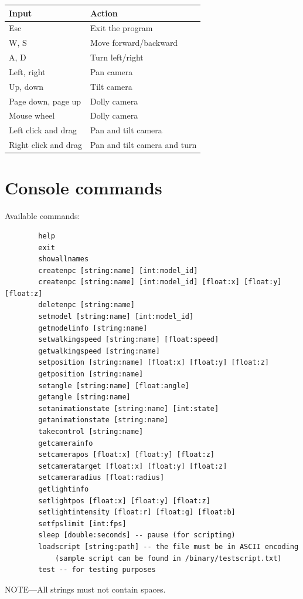 \documentclass[12pt,letterpaper]{article}
\begin{document}
	\begin{tabular}{| l | l |} \hline
	\textbf{Input} & \textbf{Action} \\\hline
	Esc & Exit the program \\\hline
	W, S & Move forward/backward \\\hline
	A, D & Turn left/right\\\hline
	Left, right & Pan camera\\\hline
	Up, down & Tilt camera\\\hline
	Page down, page up & Dolly camera\\\hline
	Mouse wheel & Dolly camera\\\hline
	Left click and drag & Pan and tilt camera\\\hline
	Right click and drag & Pan and tilt camera and turn\\\hline
	\end{tabular}
	
	\section{Console commands}
	
	Available commands:
	
	\begin{framed}
		\footnotesize
		\begin{verbatim}
		help
		exit
		showallnames
		createnpc [string:name] [int:model_id]
		createnpc [string:name] [int:model_id] [float:x] [float:y] [float:z]
		deletenpc [string:name]
		setmodel [string:name] [int:model_id]
		getmodelinfo [string:name]
		setwalkingspeed [string:name] [float:speed]
		getwalkingspeed [string:name]
		setposition [string:name] [float:x] [float:y] [float:z]
		getposition [string:name]
		setangle [string:name] [float:angle]
		getangle [string:name]
		setanimationstate [string:name] [int:state]
		getanimationstate [string:name]
		takecontrol [string:name]
		getcamerainfo
		setcamerapos [float:x] [float:y] [float:z]
		setcameratarget [float:x] [float:y] [float:z]
		setcameraradius [float:radius]
		getlightinfo
		setlightpos [float:x] [float:y] [float:z]
		setlightintensity [float:r] [float:g] [float:b]
		setfpslimit [int:fps]
		sleep [double:seconds] -- pause (for scripting)
		loadscript [string:path] -- the file must be in ASCII encoding
		    (sample script can be found in /binary/testscript.txt)
		test -- for testing purposes
		\end{verbatim}
		\normalsize
	\end{framed}
	NOTE---All strings must not contain spaces.
	
\end{document}

